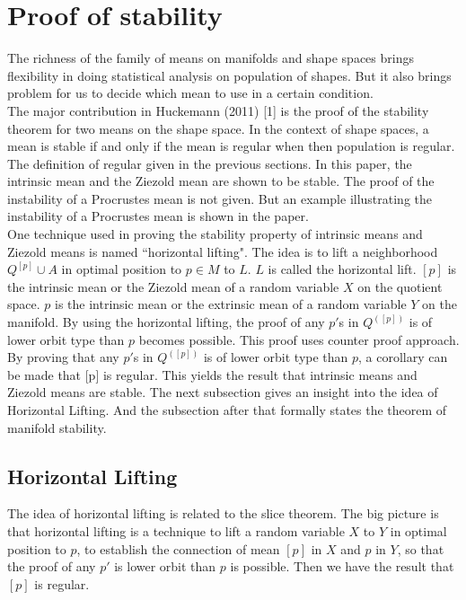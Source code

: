 \documentclass[12pt]{article}
\theoremstyle{definition}
\theoremstyle{remark}
\numberwithin{equation}{section}
\begin{document}
\section{Proof of stability}
The richness of the family of means on manifolds and shape spaces brings flexibility in doing statistical analysis on population of shapes. But it also brings problem for us to decide which mean to use in a certain condition.\\[0.2cm]
\indent The major contribution in Huckemann (2011) [1] is the proof of the stability theorem for two means on the shape space. In the context of shape spaces, a mean is stable if and only if the mean is regular when then population is regular. The definition of regular given in the previous sections. In this paper, the intrinsic mean and the Ziezold mean are shown to be stable. The proof of the instability of a Procrustes mean is not given. But an example illustrating the instability of a Procrustes mean is shown in the paper.\\[0.2cm]
\indent One technique used in proving the stability property of intrinsic means and Ziezold means is named ``horizontal lifting". The idea is to lift a neighborhood $Q^{[p]} \cup A$ in optimal position to $p \in M$ to $L$. $L$ is called the horizontal lift. $[p]$ is the intrinsic mean or the Ziezold mean of a random variable $X$ on the quotient space. $p$ is the intrinsic mean or the extrinsic mean of a random variable $Y$ on the manifold. By using the horizontal lifting, the proof of any $p'$s in $Q^{([p])}$ is of lower orbit type than $p$ becomes possible. This proof uses counter proof approach. By proving that any $p'$s in $Q^{([p])}$ is of lower orbit type than $p$, a corollary can be made that [p] is regular. This yields the result that intrinsic means and Ziezold means are stable. The next subsection gives an insight into the idea of Horizontal Lifting. And the subsection after that formally states the theorem of manifold stability.
\subsection*{Horizontal Lifting}
The idea of horizontal lifting is related to the slice theorem. The big picture is that horizontal lifting is a technique to lift a random variable $X$ to $Y$ in optimal position to $p$, to establish the connection of mean $[p]$ in $X$ and $p$ in $Y$, so that the proof of any $p'$ is lower orbit than $p$ is possible. Then we have the result that $[p]$ is regular.
\end{document}
